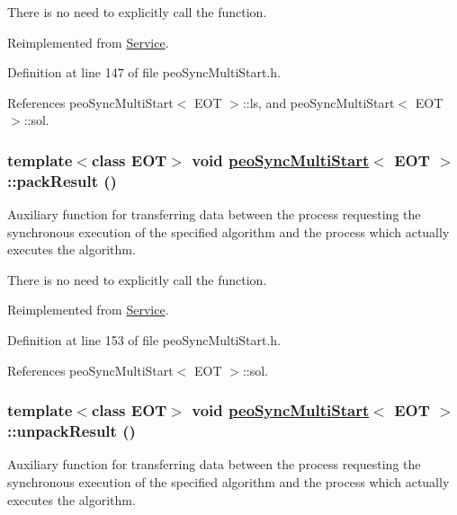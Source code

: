 There is no need to explicitly call the function. 

Reimplemented from \hyperlink{classService_e4f2894e6121e60f38d41cfbd7447ae4}{Service}.

Definition at line 147 of file peo\-Sync\-Multi\-Start.h.

References peo\-Sync\-Multi\-Start$<$ EOT $>$::ls, and peo\-Sync\-Multi\-Start$<$ EOT $>$::sol.\hypertarget{classpeoSyncMultiStart_6c48eb0dae741cff7203b65e226f9616}{
\subsubsection[packResult]{\setlength{\rightskip}{0pt plus 5cm}template$<$class EOT$>$ void \hyperlink{classpeoSyncMultiStart}{peo\-Sync\-Multi\-Start}$<$ EOT $>$::pack\-Result ()}}
\label{classpeoSyncMultiStart_6c48eb0dae741cff7203b65e226f9616}


Auxiliary function for transferring data between the process requesting the synchronous execution of the specified algorithm and the process which actually executes the algorithm. 

There is no need to explicitly call the function. 

Reimplemented from \hyperlink{classService_e5e4f90b2315e15c2a2913bd370f4cf5}{Service}.

Definition at line 153 of file peo\-Sync\-Multi\-Start.h.

References peo\-Sync\-Multi\-Start$<$ EOT $>$::sol.\hypertarget{classpeoSyncMultiStart_c3cbd1f10a89d1915c5ccf82a2c34a1d}{
\subsubsection[unpackResult]{\setlength{\rightskip}{0pt plus 5cm}template$<$class EOT$>$ void \hyperlink{classpeoSyncMultiStart}{peo\-Sync\-Multi\-Start}$<$ EOT $>$::unpack\-Result ()}}
\label{classpeoSyncMultiStart_c3cbd1f10a89d1915c5ccf82a2c34a1d}


Auxiliary function for transferring data between the process requesting the synchronous execution of the specified algorithm and the process which actually executes the algorithm. 

